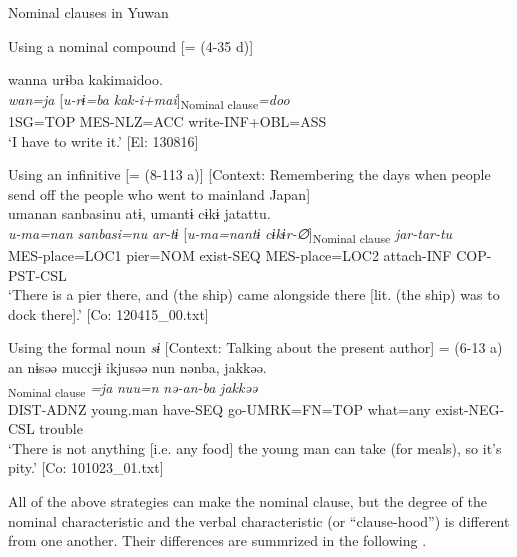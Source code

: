 \ea\label{ex:11-4}  Nominal clauses in Yuwan

  \ea Using a nominal compound [= (4-35 d)]
  
      \glll    wanna  urɨba  kakimaidoo.\\
    \textit{wan=ja}  [\textit{u-rɨ=ba}  \textit{kak-i+mai}]\textsubscript{Nominal clause}\textit{=doo}\\
    1SG=TOP  MES-NLZ=ACC  write-INF+OBL=ASS\\
    \glt     ‘I have to write it.’ [El: 130816]

  \ex Using an infinitive [= (8-113 a)]  [Context: Remembering the days when people send off the people who went to mainland Japan]\\
  
      \glll    umanan  sanbasinu  atɨ,  umantɨ  cɨkɨ  jatattu.\\
    \textit{u-ma=nan}  \textit{sanbasi=nu}  \textit{ar-tɨ}    [\textit{u-ma=nantɨ}  \textit{cɨkɨr-∅}]\textsubscript{Nominal clause}  \textit{jar-tar-tu}\\
    MES-place=LOC1  pier=NOM  exist-SEQ  MES-place=LOC2  attach-INF  COP-PST-CSL\\    
    \glt  ‘There is a pier there, and (the ship) came alongside there [lit. (the ship) was to dock there].’    [Co: 120415\_00.txt]

  \ex Using the formal noun \textit{sɨ}   [Context: Talking about the present author] = (6-13 a)\\
  
      \glll    an  nɨsəə  muccjɨ  ikjusəə  nun   nənba,  jakkəə.\\
    [\textit{a-n}  \textit{nəɨsəə}  \textit{mut-tɨ}  \textit{ik-jur=sɨ}]\textsubscript{Nominal clause} \textit{=ja}  \textit{nuu=n}   \textit{nə-an-ba}  \textit{jakkəə}\\
    DIST-ADNZ  young.man  have-SEQ  go-UMRK=FN=TOP  what=any  exist-NEG-CSL  trouble\\
    \glt    ‘There is not anything [i.e. any food] the young man can take (for meals), so it’s pity.’    [Co: 101023\_01.txt]
\z
\z

All of the above strategies can make the nominal clause, but the degree of the nominal characteristic and the verbal characteristic (or “clause-hood”) is different from one another. Their differences are summrized in the following .

